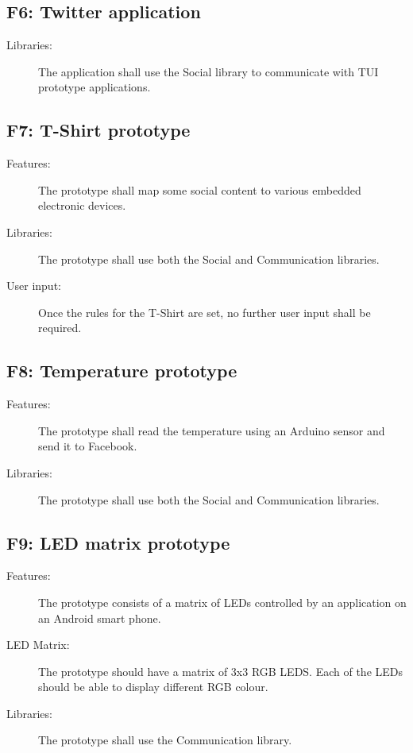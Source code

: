 \subsection{F6: Twitter application}
\begin{description}
	\item[Libraries:] The application shall use the Social library to
	communicate with TUI prototype applications.
\end{description}

\subsection{F7: T-Shirt prototype}
\begin{description}
	\item[Features:] The prototype shall map some social content to various
	embedded electronic devices.
	\item[Libraries:] The prototype shall use both the Social and Communication
	libraries.
	\item[User input:] Once the rules for the T-Shirt are set, no further user
	input shall be required.
\end{description}

\subsection{F8: Temperature prototype}
\begin{description}
	\item[Features:] The prototype shall read the temperature using an Arduino
	sensor and send it to Facebook.
	\item[Libraries:] The prototype shall use both the Social and Communication
	libraries.
\end{description}
	
\subsection{F9: LED matrix prototype}
\begin{description}
	\item[Features:] The prototype consists of a matrix of LEDs controlled by an application on 
	an Android smart phone.
	\item[LED Matrix:] The prototype should have a matrix of 3x3 RGB LEDS. Each of the LEDs should be able to display different RGB colour.
	\item[Libraries:] The prototype shall use the Communication library.
\end{description}

